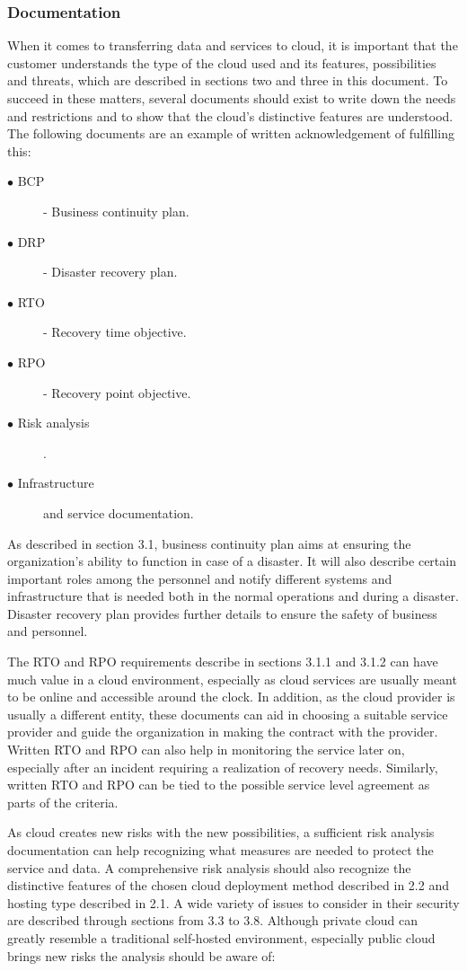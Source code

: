 \documentclass{article}
\begin{document}
\subsubsection{Documentation}
When it comes to transferring data and services to cloud, it is important that the customer understands the type of the cloud used and its features, possibilities and threats, which are described in sections two and three in this document. To succeed in these matters, several documents should exist to write down the needs and restrictions and to show that the cloud's distinctive features are understood. The following documents are an example of written acknowledgement of fulfilling this:
\begin{description}
	\item[$\bullet$ BCP] - Business continuity plan.
	\item[$\bullet$ DRP] - Disaster recovery plan.
	\item[$\bullet$ RTO] - Recovery time objective.
	\item[$\bullet$ RPO] - Recovery point objective.
	\item[$\bullet$ Risk analysis].
	\item[$\bullet$ Infrastructure] and service documentation.
\end{description}
\par
As described in section 3.1, business continuity plan aims at ensuring the organization's ability to function in case of a disaster. It will also describe certain important roles among the personnel and notify different systems and infrastructure that is needed both in the normal operations and during a disaster. Disaster recovery plan provides further details to ensure the safety of business and personnel.
\par
The RTO and RPO requirements describe in sections 3.1.1 and 3.1.2 can have much value in a cloud environment, especially as cloud services are usually meant to be online and accessible around the clock. In addition, as the cloud provider is usually a different entity, these documents can aid in choosing a suitable service provider and guide the organization in making the contract with the provider. Written RTO and RPO can also help in monitoring the service later on, especially after an incident requiring a realization of recovery needs. Similarly, written RTO and RPO can be tied to the possible service level agreement as parts of the criteria.
\par
As cloud creates new risks with the new possibilities, a sufficient risk analysis documentation can help recognizing what measures are needed to protect the service and data. A comprehensive risk analysis should also recognize the distinctive features of the chosen cloud deployment method described in 2.2 and hosting type described in 2.1. A wide variety of issues to consider in their security are described through sections from 3.3 to 3.8. Although private cloud can greatly resemble a traditional self-hosted environment, especially public cloud brings new risks the analysis should be aware of:
\end{document}
